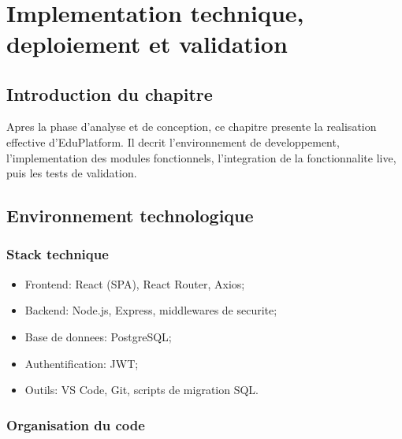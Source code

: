 ﻿﻿\documentclass[12pt,a4paper,oneside]{report}
\begin{document}

\chapter{Implementation technique, deploiement et validation}

\section{Introduction du chapitre}

Apres la phase d'analyse et de conception, ce chapitre presente la realisation effective d'EduPlatform. Il decrit l'environnement de developpement, l'implementation des modules fonctionnels, l'integration de la fonctionnalite live, puis les tests de validation.

\section{Environnement technologique}

\subsection{Stack technique}

\begin{itemize}
  \item Frontend: React (SPA), React Router, Axios;
  \item Backend: Node.js, Express, middlewares de securite;
  \item Base de donnees: PostgreSQL;
  \item Authentification: JWT;
  \item Outils: VS Code, Git, scripts de migration SQL.
\end{itemize}

\subsection{Organisation du code}
\end{document}
